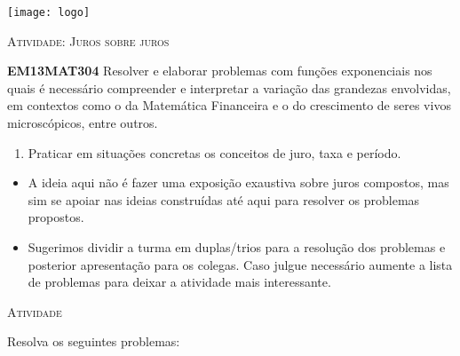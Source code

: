 \documentclass[10 pt,usenames,dvipsnames, oneside]{article}
\begin{document}
\begin{center}
  \begin{minipage}[l]{3cm}
\texttt{[image: logo]}    
\end{minipage}\hfill
\begin{minipage}[r]{.8\textwidth}
 {\Large \scshape Atividade: Juros sobre juros}  
\end{minipage}
\end{center}
\vspace{.2cm}

\ifdefined\prof
\begin{objetivos}
\item \textbf{EM13MAT304} Resolver e elaborar problemas com funções exponenciais nos quais é necessário compreender e interpretar a variação das grandezas envolvidas, em contextos como o da Matemática Financeira e o do crescimento de seres vivos microscópicos, entre outros. 
\end{objetivos}

\begin{goals}
\begin{enumerate}
\item Praticar em situações concretas os conceitos de juro, taxa e período.
\end{enumerate}

\tcblower

\begin{itemize}
\item A ideia aqui não é fazer uma exposição exaustiva sobre juros compostos, mas sim se apoiar nas ideias construídas até aqui para resolver os problemas propostos.

\item  Sugerimos dividir a turma em duplas/trios para a resolução dos problemas e posterior apresentação para os colegas. Caso julgue necessário aumente a lista de problemas para deixar a atividade mais interessante.
\end{itemize}
\end{goals}

\bigskip
\begin{center}
{\large \scshape Atividade}
\end{center}
\fi

Resolva os seguintes problemas:
\end{document}
